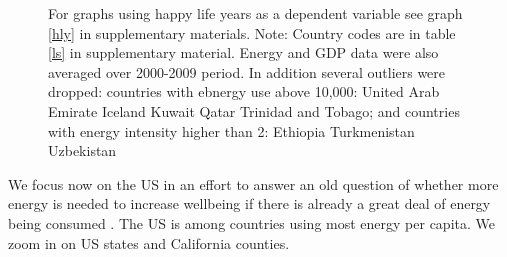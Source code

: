 \documentclass[10pt, letterpaper]{article}
\begin{document}
\begin{spacing}{1.4}
\begin{figure}[H]
{For graphs using happy life years as a dependent variable see graph \ref{hly} in
supplementary materials.  Note: Country codes are in table \ref{ls} in supplementary material. Energy and GDP data were also averaged over 2000-2009 period. In addition several outliers were dropped: countries with ebnergy use above 10,000: United Arab Emirate Iceland Kuwait Qatar Trinidad and Tobago; and countries with energy intensity higher than 2: Ethiopia Turkmenistan Uzbekistan}\label{couWvsLsEnePerGdp2} 
\end{figure}


We  focus now on the US in an effort to answer
an old question of whether more energy is needed to increase wellbeing if there
is already a great deal of energy being consumed \cite{mazur74}. The US is among
countries using most energy per capita.
%
 We zoom in on US states and California counties.


\end{spacing}
\end{document}
